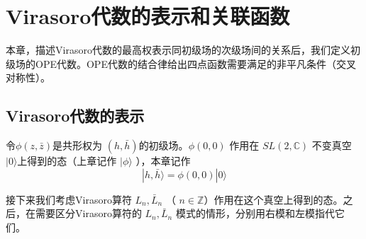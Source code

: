 \chapter{Virasoro代数的表示和关联函数}
本章，描述Virasoro代数的最高权表示同初级场的次级场间的关系后，我们定义初级场的OPE代数。OPE代数的结合律给出四点函数需要满足的非平凡条件（交叉对称性）。

\section{Virasoro代数的表示}
令$ \phi(z,\bar{z}) $是共形权为 $(h,\bar{h}) $的初级场。$ \phi(0,0)$ 作用在 $SL(2,\mathbb{C})$ 不变真空$ |0\rangle $上得到的态（上章记作 $|\phi\rangle$ ），本章记作
\begin{equation}
	|h, \bar{h}\rangle=\phi(0,0)|0\rangle
\end{equation}

接下来我们考虑Virasoro算符 $L_n,\bar{L}_n$ （ $n\in\mathbb{Z} $）作用在这个真空上得到的态。之后，在需要区分Virasoro算符的 $L_n,\bar{L}_n$ 模式的情形，分别用右模和左模指代它们。


